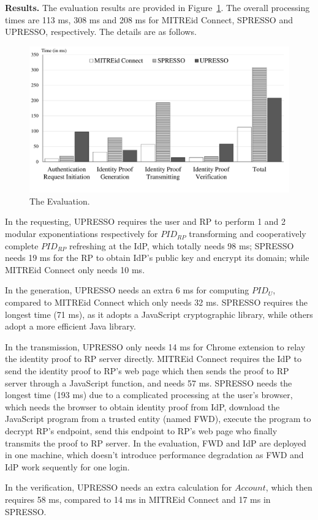 \noindent\textbf{Results.}
The evaluation results are provided in Figure~\ref{fig:evaluation}. The overall processing times are  113 ms, 308 ms and 208 ms for MITREid Connect, SPRESSO and UPRESSO, respectively. The details are as follows.

\begin{figure}
  \centering
  \includegraphics[width=\linewidth]{fig/evaluation2.pdf}
  \caption{The Evaluation.}
  \label{fig:evaluation}
\end{figure}

In the requesting, UPRESSO requires the user and RP to perform 1 and 2  modular exponentiations respectively for $PID_{RP}$ transforming and cooperatively complete $PID_{RP}$ refreshing at the IdP, which totally needs 98 ms;  SPRESSO needs 19 ms for the RP to obtain IdP's public key and encrypt its domain; while MITREid Connect only needs 10 ms.

In the generation, UPRESSO needs  an extra 6 ms for computing $PID_U$, compared to MITREid Connect which only needs 32 ms.
SPRESSO requires the longest time (71 ms), as it adopts a JavaScript cryptographic library, while others adopt a more efficient Java library.

In the transmission, UPRESSO only needs 14 ms for Chrome extension to relay the identity proof to RP server directly.
MITREid Connect requires the IdP to send the identity proof to  RP's web page which then sends the proof to RP server through a JavaScript function, and needs 57 ms.
SPRESSO needs the longest time (193 ms) due to a complicated processing at the user's browser,
  which needs the browser to obtain identity proof from IdP, download the JavaScript program from a trusted entity (named FWD), execute the program to decrypt RP's endpoint, send this endpoint to RP's web page who finally transmits the proof to RP server.
In the evaluation,  FWD and IdP are deployed in one machine, which doesn't introduce performance degradation as  FWD and IdP work sequently for one login.



In the verification, UPRESSO needs an extra calculation for $Account$, which then requires  58 ms, compared to 14 ms in MITREid Connect and 17 ms in SPRESSO.



